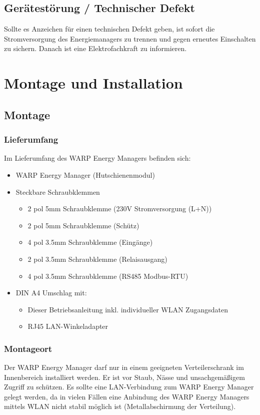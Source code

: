 \documentclass[a4paper,10pt]{article}
\begin{document}
\begin{multicols*}{2}
	\subsection{Gerätestörung / Technischer Defekt}
	Sollte es Anzeichen für einen technischen Defekt geben, ist sofort die
	Stromversorgung des Energiemanagers zu trennen und gegen erneutes Einschalten zu
	sichern. Danach ist eine Elektrofachkraft zu informieren.

	\newpage
	\section{Montage und Installation}
	\subsection{Montage}
	\subsubsection{Lieferumfang}
	Im Lieferumfang des WARP Energy Managers befinden sich:
	\begin{itemize}
		\item WARP Energy Manager (Hutschienenmodul)
		\item Steckbare Schraubklemmen
		\begin{itemize}
			\item 2 pol 5mm Schraubklemme (230V Stromversorgung (L+N))
			\item 2 pol 5mm Schraubklemme (Schütz)
			\item 4 pol 3.5mm Schraubklemme (Eingänge)
			\item 2 pol 3.5mm Schraubklemme (Relaisausgang)
			\item 4 pol 3.5mm Schraubklemme (RS485 Modbus-RTU)
		\end{itemize}
		\item DIN A4 Umschlag mit:
		\begin{itemize}
			\item Dieser Betriebsanleitung inkl. individueller WLAN Zugangsdaten
			\item RJ45 LAN-Winkeladapter
		\end{itemize}
	\end{itemize}

	\subsubsection{Montageort}
	Der WARP Energy Manager darf nur in einem geeigneten Verteilerschrank im
	Innenbereich installiert werden. Er ist vor Staub, Nässe und unsachgemäßigem
	Zugriff zu schützen. Es sollte
	eine LAN-Verbindung zum WARP Energy Manager gelegt werden, da in vielen
	Fällen eine Anbindung des WARP Energy Managers mittels WLAN nicht stabil
	möglich ist (Metallabschirmung der Verteilung).


\end{multicols*}
\end{document}
